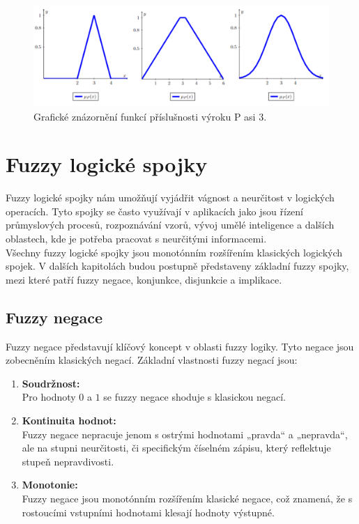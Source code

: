     \begin{figure}[h]
    \caption{Grafické znázornění funkcí příslušnosti výroku P \clqq asi 3\crqq.\\}
        \includegraphics[scale=0.65]{template-fig/asi_3.pdf}
        \centering
    \end{figure}




\section{Fuzzy logick\'e spojky}

Fuzzy logické spojky n\'am umo\v z\v nují vyjádřit vágnost a neurčitost v logických operacích. Tyto spojky se často využívají v aplikacích jako jsou řízení průmyslových procesů, rozpoznávání vzorů, vývoj umělé inteligence a dalších oblastech, kde je potřeba pracovat s neurčitými informacemi.\\

V\v sechny fuzzy logick\'e spojky jsou monot\'onn\'im roz\v s\'i\v ren\'im klasick\'ych logick\'ych spojek. V dalších kapitolách budou postupně představeny základní fuzzy spojky, mezi kter\'e  patří 
fuzzy negace, konjunkce, disjunkcie a implikace. 

\subsection{Fuzzy negace}

Fuzzy negace představují klíčový koncept v oblasti fuzzy logiky. Tyto negace jsou zobecn\v en\'im klasick\'ych negac\'i. Základní vlastnosti fuzzy negací jsou:

\begin{enumerate}
\item \textbf{Soudržnost:}\\
Pro hodnoty $0$ a $1$ se fuzzy negace shoduje s klasickou negac\'i.
    \item \textbf{Kontinuita hodnot:} \\
        Fuzzy negace nepracuje jenom s  ostrými hodnotami „pravda“ a „nepravda“, ale na stupni neurčitosti, či specifickým číselném zápisu, který reflektuje stupeň nepravdivosti.
    \item \textbf{Monotonie:} \\
        Fuzzy negace jsou monot\'onn\'im roz\v s\'i\v ren\'im klasick\'e negace, což znamená, že s rostoucími vstupn\'imi hodnotami klesaj\'i hodnoty výstupn\'e.
    
\end{enumerate}

